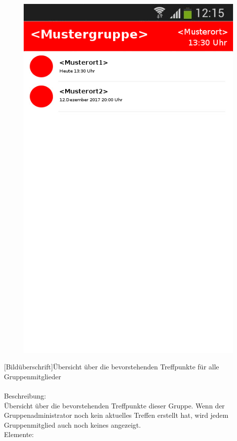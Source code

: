 \begin{figure}
	\includegraphics[scale =1]{resources/images/treffpunktuebersicht.png}
\end{figure}
[Bildüberschrift]Übersicht über die bevorstehenden Treffpunkte für alle Gruppenmitglieder\\ \\
[Kleinüberschrift]Beschreibung:\\
Übersicht über die bevorstehenden Treffpunkte dieser Gruppe. Wenn der Gruppenadministrator noch kein aktuelles Treffen erstellt hat, wird jedem Gruppenmitglied auch noch keines angezeigt.\\
[Kleinüberschrift]Elemente:\\
